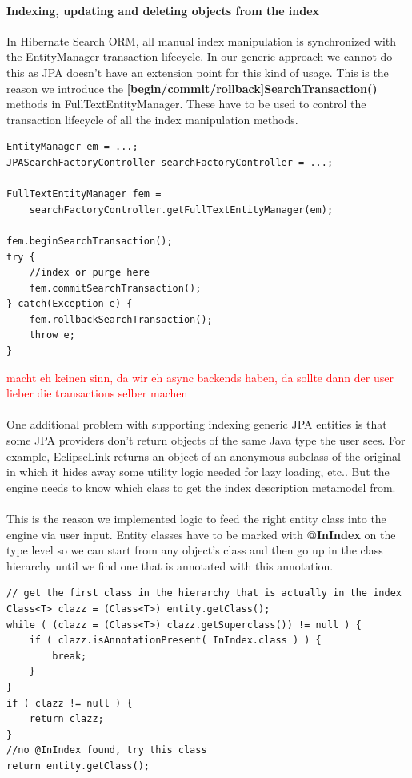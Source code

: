 \paragraph{Indexing, updating and deleting objects from the index}

In Hibernate Search ORM, all manual index manipulation is synchronized with the EntityManager transaction lifecycle. In our generic approach we cannot do this as JPA doesn't have an extension point for this kind of usage. This is the reason we introduce the \textbf{[begin/commit/rollback]SearchTransaction()} methods in FullTextEntityManager. These have to be used to control the transaction lifecycle of all the index manipulation methods.
\\
\lstset{language=java}
\begin{lstlisting}[frame=htrbl, caption={Index control with Hibernate Search GenericJPA}, label={lst:index_control_hibernatesearchgenericjpa}]
EntityManager em = ...;
JPASearchFactoryController searchFactoryController = ...;

FullTextEntityManager fem = 
	searchFactoryController.getFullTextEntityManager(em);

fem.beginSearchTransaction();
try {
	//index or purge here
	fem.commitSearchTransaction();
} catch(Exception e) {
	fem.rollbackSearchTransaction();
	throw e;
}
\end{lstlisting}
\textcolor{red}{macht eh keinen sinn, da wir eh async backends haben, da sollte dann der user lieber die transactions selber machen}
\\\\
One additional problem with supporting indexing generic JPA entities is that some JPA providers don't return objects of the same Java type the user sees. For example, EclipseLink returns an object of an anonymous subclass of the original in which it hides away some utility logic needed for lazy loading, etc.. But the engine needs to know which class to get the index description metamodel from.
\\\\
This is the reason we implemented logic to feed the right entity class into the engine via user input. Entity classes have to be marked with \textbf{@InIndex} on the type level so we can start from any object's class and then go up in the class hierarchy until we find one that is annotated with this annotation.
\\
\lstset{language=java}
\begin{lstlisting}[frame=htrbl, caption={Algorithm to determine the actual indexed type}, label={lst:algo_subclasssupport}]
// get the first class in the hierarchy that is actually in the index
Class<T> clazz = (Class<T>) entity.getClass();
while ( (clazz = (Class<T>) clazz.getSuperclass()) != null ) {
	if ( clazz.isAnnotationPresent( InIndex.class ) ) {
		break;
	}
}
if ( clazz != null ) {
	return clazz;
}
//no @InIndex found, try this class
return entity.getClass();
\end{lstlisting}
